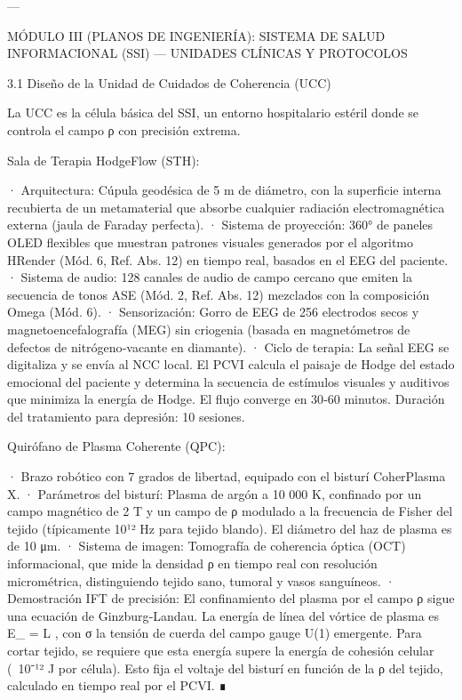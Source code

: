 \documentclass[12pt,twoside]{book}
\begin{document}
---

MÓDULO III (PLANOS DE INGENIERÍA): SISTEMA DE SALUD INFORMACIONAL (SSI) — UNIDADES CLÍNICAS Y PROTOCOLOS

3.1 Diseño de la Unidad de Cuidados de Coherencia (UCC)

La UCC es la célula básica del SSI, un entorno hospitalario estéril donde se controla el campo ρ con precisión extrema.

Sala de Terapia HodgeFlow (STH):

· Arquitectura: Cúpula geodésica de 5 m de diámetro, con la superficie interna recubierta de un metamaterial que absorbe cualquier radiación electromagnética externa (jaula de Faraday perfecta).
· Sistema de proyección: 360° de paneles OLED flexibles que muestran patrones visuales generados por el algoritmo HRender (Mód. 6, Ref. Abs. 12) en tiempo real, basados en el EEG del paciente.
· Sistema de audio: 128 canales de audio de campo cercano que emiten la secuencia de tonos ASE (Mód. 2, Ref. Abs. 12) mezclados con la composición Omega (Mód. 6).
· Sensorización: Gorro de EEG de 256 electrodos secos y magnetoencefalografía (MEG) sin criogenia (basada en magnetómetros de defectos de nitrógeno‑vacante en diamante).
· Ciclo de terapia: La señal EEG se digitaliza y se envía al NCC local. El PCVI calcula el paisaje de Hodge del estado emocional del paciente y determina la secuencia de estímulos visuales y auditivos que minimiza la energía de Hodge. El flujo converge en 30‑60 minutos. Duración del tratamiento para depresión: 10 sesiones.

Quirófano de Plasma Coherente (QPC):

· Brazo robótico con 7 grados de libertad, equipado con el bisturí CoherPlasma X.
· Parámetros del bisturí: Plasma de argón a 10 000 K, confinado por un campo magnético de 2 T y un campo de ρ modulado a la frecuencia de Fisher del tejido (típicamente 10¹² Hz para tejido blando). El diámetro del haz de plasma es de 10 μm.
· Sistema de imagen: Tomografía de coherencia óptica (OCT) informacional, que mide la densidad ρ en tiempo real con resolución micrométrica, distinguiendo tejido sano, tumoral y vasos sanguíneos.
· Demostración IFT de precisión: El confinamiento del plasma por el campo ρ sigue una ecuación de Ginzburg‑Landau. La energía de línea del vórtice de plasma es  E_{} = \sigma \cdot L , con σ la tensión de cuerda del campo gauge U(1) emergente. Para cortar tejido, se requiere que esta energía supere la energía de cohesión celular (~10⁻¹² J por célula). Esto fija el voltaje del bisturí en función de la ρ del tejido, calculado en tiempo real por el PCVI. ∎
\end{document}
